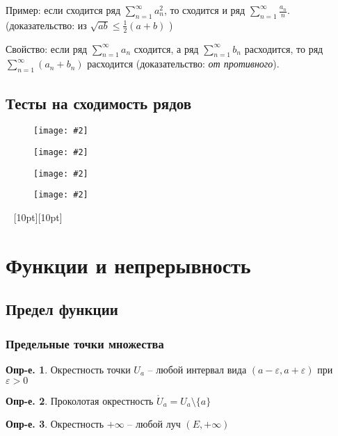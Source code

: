 \documentclass[a4paper,12pt]{article}
\numberwithin{figure}{section}
\newcommand\cfigure[2]{
	\begin{figure}[H] \centering \texttt{[image: \#2]} \end{figure}
}
\theoremstyle{definition}
\newtheorem{definition}{Опр-е.}[section]
\def\DS{\displaystyle}
\def\eps{\varepsilon}
\def\ringU{\mathring{U}}
\def\leqs{\leqslant}
\def\vignette{\vspace{48pt} \noindent \hrulefill~ \raisebox{-8pt}[10pt][10pt]{\Huge\ding{102}}~ \hrulefill}
\begin{document}
\bigbreak
Пример: если сходится ряд $\DS \sum_{n=1}^{\infty}a_n^2$,
то сходится и ряд $\DS \sum_{n=1}^{\infty}\frac{a_n}n$.
\\ \Big(доказательство: из $\sqrt{ab}\leqs\frac12(a+b)$ \Big)

\bigbreak
Свойство: если ряд $\DS \sum_{n=1}^{\infty}a_n$ сходится,
а ряд $\DS \sum_{n=1}^{\infty}b_n$ расходится,
то ряд $\DS \sum_{n=1}^{\infty} (a_n + b_n)$ расходится
(доказательство: \textit{от противного}).


\subsection{Тесты на сходимость рядов}

\cfigure{\linewidth}{rows-test-1.png}

\cfigure{\linewidth}{rows-test-2.png}

\cfigure{\linewidth}{rows-test-3.png}

\cfigure{\linewidth}{rows-test-4.png}


\vignette
\section{Функции и непрерывность}


\subsection{Предел функции}

\subsubsection{Предельные точки множества}

\begin{definition} Окрестность точки $U_a$ -- любой интервал вида $(a-\eps,a+\eps)$ при $\eps>0$ \end{definition}

\begin{definition} Проколотая окрестность $\ringU_a = U_a \setminus \{a\}$ \end{definition}

\begin{definition} Окрестность $+\infty$ -- любой луч $(E,+\infty)$ \end{definition}
\end{document}
